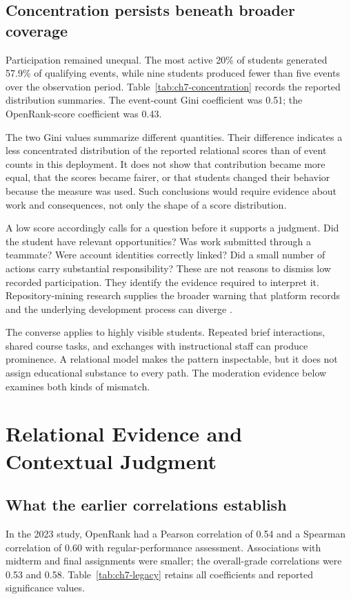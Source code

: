 \subsection{Concentration persists beneath broader coverage}
Participation remained unequal. The most active 20\% of students generated 57.9\% of qualifying events, while nine students produced fewer than five events over the observation period. Table~\ref{tab:ch7-concentration} records the reported distribution summaries. The event-count Gini coefficient was 0.51; the OpenRank-score coefficient was 0.43.



The two Gini values summarize different quantities. Their difference indicates a less concentrated distribution of the reported relational scores than of event counts in this deployment. It does not show that contribution became more equal, that the scores became fairer, or that students changed their behavior because the measure was used. Such conclusions would require evidence about work and consequences, not only the shape of a score distribution.

A low score accordingly calls for a question before it supports a judgment. Did the student have relevant opportunities? Was work submitted through a teammate? Were account identities correctly linked? Did a small number of actions carry substantial responsibility? These are not reasons to dismiss low recorded participation. They identify the evidence required to interpret it. Repository-mining research supplies the broader warning that platform records and the underlying development process can diverge \citep{kalliamvakou2014}.

The converse applies to highly visible students. Repeated brief interactions, shared course tasks, and exchanges with instructional staff can produce prominence. A relational model makes the pattern inspectable, but it does not assign educational substance to every path. The moderation evidence below examines both kinds of mismatch.

\section{Relational Evidence and Contextual Judgment}
\label{sec:ch7-agreement}

\subsection{What the earlier correlations establish}
In the 2023 study, OpenRank had a Pearson correlation of 0.54 and a Spearman correlation of 0.60 with regular-performance assessment. Associations with midterm and final assignments were smaller; the overall-grade correlations were 0.53 and 0.58. Table~\ref{tab:ch7-legacy} retains all coefficients and reported significance values.

